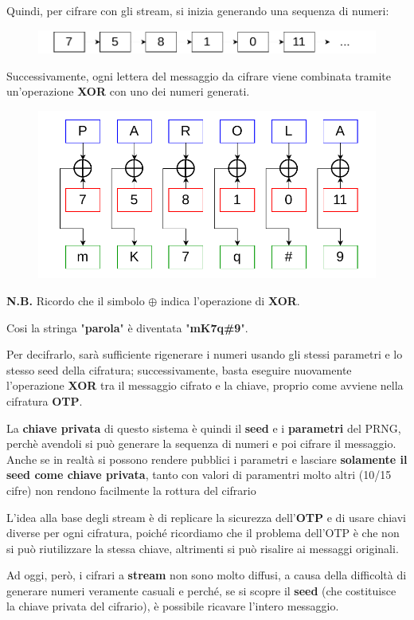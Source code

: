 \documentclass{rapport}
\begin{document}
Quindi, per cifrare con gli stream, si inizia generando una sequenza di numeri:

\begin{figure}[h]
    \centering 
    \includegraphics[width=0.8\linewidth]{logos/4_1cripto.pdf}
\end{figure}

Successivamente, ogni lettera del messaggio da cifrare viene combinata tramite un'operazione \textbf{XOR} con uno dei numeri generati.

\begin{figure}[h]
    \centering
    \includegraphics[width=0.8\linewidth]{logos/4_2cripto.pdf}
\end{figure}


\textbf{N.B.} Ricordo che il simbolo $\oplus$ indica l'operazione di \textbf{XOR}.


Cosi la stringa "\textbf{parola}" è diventata "\textbf{mK7q\#9}".

Per decifrarlo, sarà sufficiente rigenerare i numeri usando gli stessi parametri e lo stesso seed della cifratura; successivamente, basta eseguire nuovamente l'operazione \textbf{XOR} tra il messaggio cifrato e la chiave, proprio come avviene nella cifratura \textbf{OTP}.

La \textbf{chiave privata} di questo sistema è quindi il \textbf{seed} e i \textbf{parametri} del PRNG, perchè avendoli si può generare la sequenza di numeri e poi cifrare il messaggio. Anche se in realtà si possono rendere pubblici i parametri e lasciare \textbf{solamente il seed come chiave privata}, tanto con valori di paramentri molto altri (10/15 cifre) non rendono facilmente la rottura del cifrario


L'idea alla base degli stream è di replicare la sicurezza dell'\textbf{OTP} e di usare chiavi diverse per ogni cifratura, poiché ricordiamo che il problema dell'OTP è che non si può riutilizzare la stessa chiave, altrimenti si può risalire ai messaggi originali.


Ad oggi, però, i cifrari a \textbf{stream} non sono molto diffusi, a causa della difficoltà di generare numeri veramente casuali e perché, se si scopre il \textbf{seed} (che costituisce la chiave privata del cifrario), è possibile ricavare l'intero messaggio.
\end{document}
